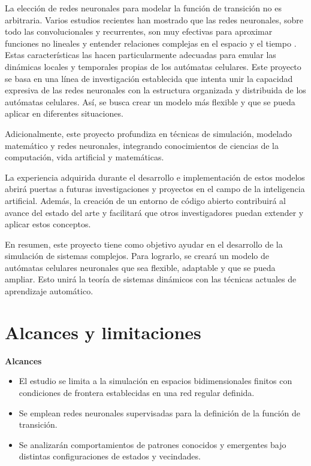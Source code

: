 La elección de redes neuronales para modelar la función de transición no es arbitraria. Varios estudios recientes han mostrado que las redes neuronales, sobre todo las convolucionales y recurrentes, son muy efectivas para aproximar funciones no lineales y entender relaciones complejas en el espacio y el tiempo \cite{mordvintsevNCA, mordvintsev2020growing}. Estas características las hacen particularmente adecuadas para emular las dinámicas locales y temporales propias de los autómatas celulares. Este proyecto se basa en una línea de investigación establecida que intenta unir la capacidad expresiva de las redes neuronales con la estructura organizada y distribuida de los autómatas celulares. Así, se busca crear un modelo más flexible y que se pueda aplicar en diferentes situaciones.

Adicionalmente, este proyecto profundiza en técnicas de simulación, modelado matemático y redes neuronales, integrando conocimientos de ciencias de la computación, vida artificial y matemáticas.

La experiencia adquirida durante el desarrollo e implementación de estos modelos abrirá puertas a futuras investigaciones y proyectos en el campo de la inteligencia artificial. Además, la creación de un entorno de código abierto contribuirá al avance del estado del arte y facilitará que otros investigadores puedan extender y aplicar estos conceptos.

En resumen, este proyecto tiene como objetivo ayudar en el desarrollo de la simulación de sistemas complejos. Para lograrlo, se creará un modelo de autómatas celulares neuronales que sea flexible, adaptable y que se pueda ampliar. Esto unirá la teoría de sistemas dinámicos con las técnicas actuales de aprendizaje automático.

\section{Alcances y limitaciones}

\textbf{Alcances}

\begin{itemize}
	
	\item El estudio se limita a la simulación en espacios bidimensionales finitos con condiciones de frontera establecidas en una red regular definida.
	
	\item Se emplean redes neuronales supervisadas para la definición de la función de transición.
	
	\item Se analizarán comportamientos de patrones conocidos y emergentes bajo distintas configuraciones de estados y vecindades.
	
\end{itemize}

